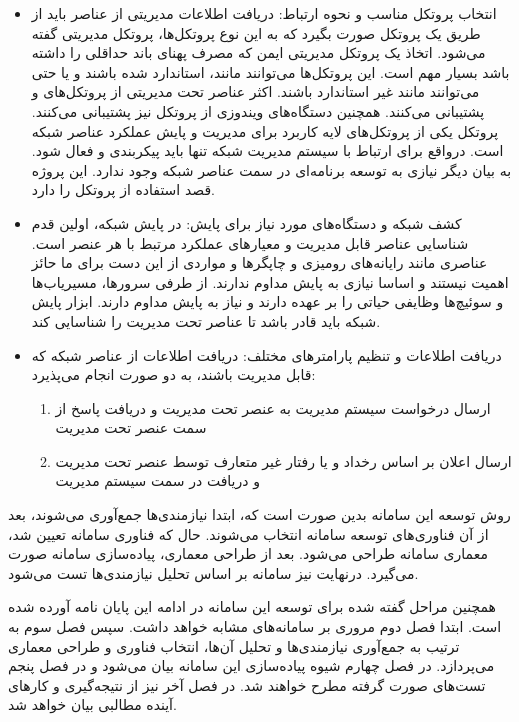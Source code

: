 \begin{itemize}
    \item انتخاب پروتکل مناسب و نحوه ارتباط: دریافت اطلاعات مدیریتی از عناصر باید از طریق یک پروتکل صورت بگیرد که به این نوع پروتکل‌ها، پروتکل مدیریتی گفته می‌شود. اتخاذ یک پروتکل مدیریتی ایمن که مصرف پهنای باند حداقلی را داشته باشد بسیار مهم است. این پروتکل‌ها می‌توانند مانند، استاندارد شده باشند و یا حتی می‌توانند مانند  غیر استاندارد باشند. اکثر عناصر تحت مدیریتی از پروتکل‌های  و   پشتیبانی می‌کنند. همچنین دستگاه‌های ویندوزی از پروتکل  نیز پشتیبانی می‌کنند. پروتکل   یکی از پروتکل‌های لایه کاربرد برای مدیریت و پایش عملکرد عناصر شبکه است. درواقع برای ارتباط با سیستم مدیریت شبکه تنها باید پیکربندی و فعال شود. به بیان دیگر نیازی به توسعه برنامه‌ای در سمت عناصر شبکه وجود ندارد\cite{hare2011simple}. این پروژه قصد استفاده از پروتکل  را دارد.
\newpage
    \item کشف شبکه و دستگاه‌های مورد نیاز برای پایش: در پایش شبکه، اولین قدم شناسایی عناصر قابل مدیریت و معیارهای عملکرد مرتبط با هر عنصر است. عناصری مانند رایانه‌های رومیزی و چاپگرها و مواردی از این دست برای ما حائز اهمیت نیستند و اساسا نیازی به پایش مداوم ندارند. از طرفی سرورها، مسیریاب‌ها و سوئیچ‌ها وظایفی حیاتی را بر عهده دارند و نیاز به پایش مداوم دارند. ابزار پایش شبکه باید قادر باشد تا عناصر تحت مدیریت را شناسایی کند.
    \item دریافت اطلاعات و تنظیم پارامترهای مختلف: دریافت اطلاعات از عناصر شبکه که قابل مدیریت باشند، به دو صورت انجام می‌پذیرد:
    \begin{enumerate}
        \item ارسال درخواست سیستم مدیریت به عنصر تحت مدیریت و دریافت پاسخ از سمت عنصر تحت مدیریت
        \item ارسال اعلان بر اساس رخداد و یا رفتار غیر متعارف توسط عنصر تحت مدیریت و دریافت در سمت سیستم مدیریت
    \end{enumerate}
\end{itemize}


روش توسعه این سامانه بدین صورت است که، ابتدا نیازمندی‌ها جمع‌آوری می‌شوند، بعد از آن فناوری‌های توسعه سامانه انتخاب می‌شوند. حال که فناوری سامانه تعیین شد، معماری سامانه طراحی می‌شود. بعد از طراحی معماری، پیاده‌سازی سامانه صورت می‌گیرد. درنهایت نیز سامانه بر اساس تحلیل نیازمندی‌ها تست می‌شود. 

همچنین مراحل گفته شده برای توسعه این سامانه در ادامه این پایان نامه آورده شده است. ابتدا فصل دوم مروری بر سامانه‌های مشابه خواهد داشت. سپس فصل سوم به ترتیب به جمع‌آوری نیازمندی‌ها و تحلیل آن‌ها، انتخاب فناوری و طراحی معماری می‌پردازد. در فصل چهارم شیوه پیاده‌سازی این سامانه بیان می‌شود و در فصل پنجم تست‌های صورت گرفته مطرح خواهند شد. در فصل آخر نیز از نتیجه‌گیری و کارهای آینده مطالبی بیان خواهد شد.

